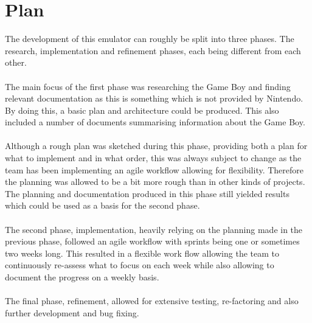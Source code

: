 \section{Plan}
The development of this emulator can roughly be split into three phases. The research, implementation and refinement phases, each being different from each other.
\\\\
The main focus of the first phase was researching the Game Boy and finding relevant documentation as this is something which is not provided by Nintendo. By doing this, a basic plan and architecture could be produced. This also included a number of documents summarising information about the Game Boy.
\\\\
Although a rough plan was sketched during this phase, providing both a plan for what to implement and in what order, this was always subject to change as the team has been implementing an agile  workflow allowing for flexibility. Therefore the planning was allowed to be a bit more rough than in other kinds of projects. The planning and documentation produced in this phase still yielded results which could be used as a basis for the second phase. 
\\\\
The second phase, implementation, heavily relying on the planning made in the previous phase, followed an agile workflow with sprints being one or sometimes two weeks long. This resulted in a flexible work flow allowing the team to continuously re-assess what to focus on each week while also allowing to document the progress on a weekly basis.
\\\\
The final phase, refinement, allowed for extensive testing, re-factoring and also further development and bug fixing.
\\\\
\newpage
